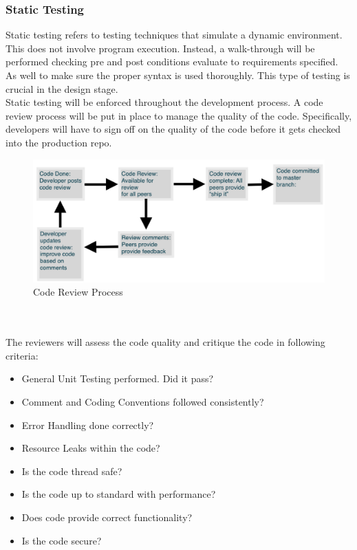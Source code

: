 \documentclass[12pt]{article}
\begin{document}
\subsubsection{Static Testing}
Static testing refers to testing techniques that simulate a dynamic environment. This does not involve program execution. Instead, a walk-through will be performed checking pre and post conditions evaluate to requirements specified. As well to make sure the proper syntax is used thoroughly. This type of testing is crucial in the design stage. \\
Static testing will be enforced throughout the development process. A code review process will be put in place to manage the quality of the code. Specifically, developers will have to sign off on the quality of the code before it gets checked into the production repo.
\begin{figure}[!htb]
\includegraphics[width=\textwidth,height=\textheight,keepaspectratio]{review_process.png}
\caption{Code Review Process}
\label{fig:CodeReview}
\end{figure}
\\\\
The reviewers will assess the code quality and critique the code in following criteria:\\
\begin{itemize}
 \item General Unit Testing performed. Did it pass?
 \item Comment and Coding Conventions followed consistently?
 \item Error Handling done correctly?
 \item Resource Leaks within the code?
 \item Is the code thread safe?
 \item Is the code up to standard with performance?
 \item Does code provide correct functionality?
 \item Is the code secure?
 \end{itemize}
\end{document}
